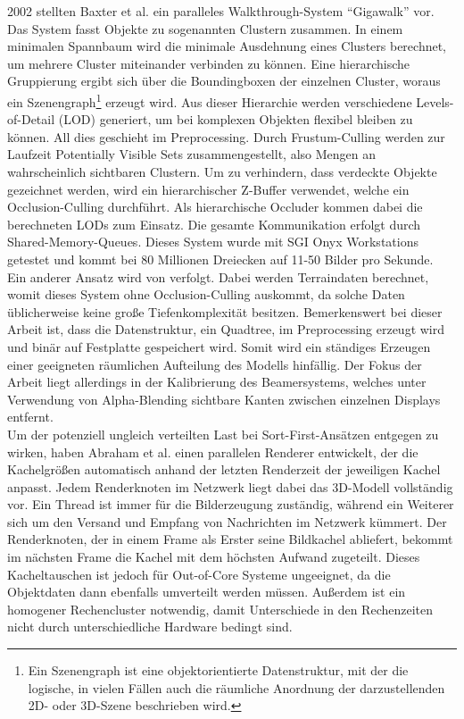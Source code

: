 2002 stellten Baxter et al. \cite{baxter} ein paralleles Walkthrough-System "`Gigawalk"' vor. Das System fasst Objekte zu sogenannten Clustern zusammen. In einem minimalen Spannbaum wird die minimale Ausdehnung eines Clusters berechnet, um mehrere Cluster miteinander verbinden zu können. Eine hierarchische Gruppierung ergibt sich über die Boundingboxen der einzelnen Cluster, woraus ein Szenengraph\footnote{Ein Szenengraph ist eine objektorientierte Datenstruktur, mit der die logische, in vielen Fällen auch die räumliche Anordnung der darzustellenden 2D- oder 3D-Szene beschrieben wird.} erzeugt wird. Aus dieser Hierarchie werden verschiedene Levels-of-Detail (LOD)\cite{hlod} generiert, um bei komplexen Objekten flexibel bleiben zu können. All dies geschieht im Preprocessing. Durch Frustum-Culling werden zur Laufzeit Potentially Visible Sets \cite{RTR3} zusammengestellt, also Mengen an wahrscheinlich sichtbaren Clustern. Um zu verhindern, dass verdeckte Objekte gezeichnet werden, wird ein hierarchischer Z-Buffer verwendet, welche ein Occlusion-Culling durchführt. Als hierarchische Occluder kommen dabei die berechneten LODs zum Einsatz. Die gesamte Kommunikation erfolgt durch Shared-Memory-Queues. Dieses System wurde mit SGI Onyx Workstations getestet und kommt bei 80 Millionen Dreiecken auf 11-50 Bilder pro Sekunde.\\
Ein anderer Ansatz wird von \cite{DBLP:journals/ijvr/YinJSZ06} verfolgt. Dabei werden Terraindaten berechnet, womit dieses System ohne Occlusion-Culling auskommt, da solche Daten üblicherweise keine große Tiefenkomplexität besitzen. Bemerkenswert bei dieser Arbeit ist, dass die Datenstruktur, ein Quadtree, im Preprocessing erzeugt wird und binär auf Festplatte gespeichert wird. Somit wird ein ständiges Erzeugen einer geeigneten räumlichen Aufteilung des Modells hinfällig. Der Fokus der Arbeit liegt allerdings in der Kalibrierung des Beamersystems, welches unter Verwendung von Alpha-Blending sichtbare Kanten zwischen einzelnen Displays entfernt.\\
Um der potenziell ungleich verteilten Last bei Sort-First-Ansätzen entgegen zu wirken, haben Abraham et al. \cite{abraham} einen parallelen Renderer entwickelt, der die Kachelgrößen automatisch anhand der letzten Renderzeit der jeweiligen Kachel anpasst. Jedem Renderknoten im Netzwerk liegt dabei das 3D-Modell vollständig vor. Ein Thread ist immer für die Bilderzeugung zuständig, während ein Weiterer sich um den Versand und Empfang von Nachrichten im Netzwerk kümmert. Der Renderknoten, der in einem Frame als Erster seine Bildkachel abliefert, bekommt im nächsten Frame die Kachel mit dem höchsten Aufwand zugeteilt. Dieses Kacheltauschen ist jedoch für Out-of-Core Systeme ungeeignet, da die Objektdaten dann ebenfalls umverteilt werden müssen. Außerdem ist ein homogener Rechencluster notwendig, damit Unterschiede in den Rechenzeiten nicht durch unterschiedliche Hardware bedingt sind.

